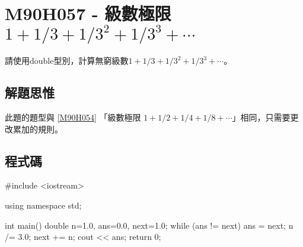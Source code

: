 \section{M90H057 - 級數極限 $1+1/3+1/3^2+1/3^3+\cdots$}
請使用double型別，計算無窮級數$1+1/3+1/3^2+1/3^3+\cdots$。 

\subsection{解題思惟}
此題的題型與
\ref{M90H054}
「級數極限 $1+1/2+1/4+1/8+\cdots$」相同，只需要更改累加的規則。


\subsection{程式碼}
\begin{cppcode}
	#include <iostream>
	
	using namespace std;
	
	int main()
	{
		double n=1.0, ans=0.0, next=1.0;
		while (ans != next) {
			ans = next;
			n /= 3.0;
			next += n;
		}
		cout << ans;
		return 0;
	}
\end{cppcode}
